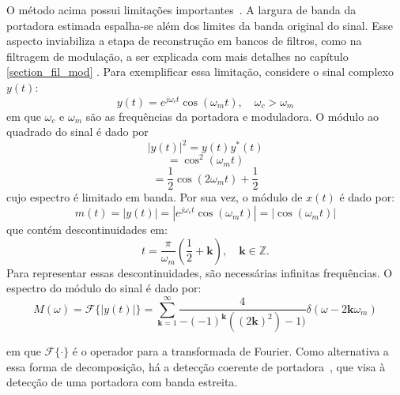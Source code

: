 O método acima possui limitações importantes~\cite{schimmel2007}. A largura de
banda da portadora estimada espalha-se além dos limites da banda original do
sinal. Esse aspecto inviabiliza a etapa de reconstrução em bancos de filtros,
como na filtragem de modulação, a ser explicada com mais detalhes no capítulo
\ref{section_fil_mod} . Para exemplificar essa limitação, considere o sinal complexo $y(t)$:
\begin{equation}
    y(t) = e^{j\omega_c t}\cos(\omega_m t), \quad \omega_c > \omega_m 
\end{equation}
em que $\omega_c$ e $\omega_m$ são as frequências da portadora e moduladora. O módulo ao quadrado do sinal é dado por
\begin{equation}
    |y(t)|^2  = y(t)y^*(t)
\end{equation}
\begin{equation}
    = \cos^2(\omega_m t)
\end{equation}
\begin{equation}
    = \frac{1}{2}\cos(2 \omega_m t) + \frac{1}{2}
\end{equation}
cujo espectro é limitado em banda. Por sua vez, o módulo de $x(t)$ é dado
por:
\begin{equation}
    m(t) = |y(t)| = |e^{j\omega_c t}\cos(\omega_m t)| = |\cos(\omega_m t)|
\end{equation}
que contém descontinuidades em:
\begin{equation}
t = \frac{\pi}{\omega_m} (\frac{1}{2}+ \mathbf{k}) , \quad \mathbf{k} \in \mathbb{Z} .
\end{equation}
Para representar essas descontinuidades, são necessárias infinitas frequências.
O espectro do módulo do sinal é dado por:
\begin{equation}
    M(\omega) = \mathcal{F}\{|y(t)|\} = \sum_{\mathbf{k} = 1}^{\infty}\frac{4}{-(-1)^\mathbf{k} ((2\mathbf{k})^2) - 1)} \delta(\omega - 2 \mathbf{k} \omega_m)   
\end{equation}

em que $\mathcal{F\{\cdot\}}$ é o operador para a transformada de Fourier. Como
alternativa a essa forma de decomposição, há a detecção coerente de
portadora~\cite{atlas2005,clark2009time,clark2009sum}, que visa à detecção de
uma portadora com banda estreita.